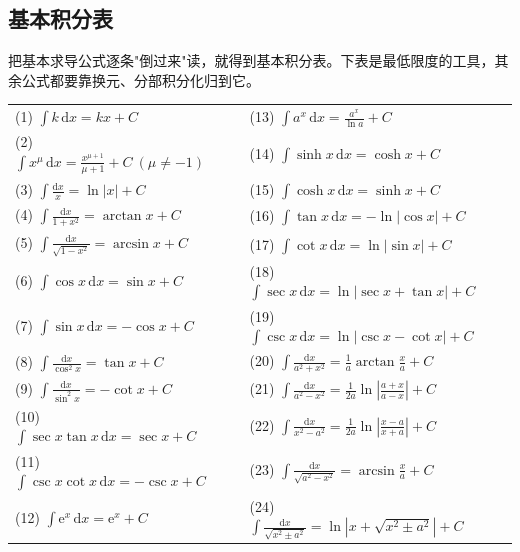 

\subsection{基本积分表}

把基本求导公式逐条"倒过来"读，就得到基本积分表。下表是最低限度的工具，其余公式都要靠换元、分部积分化归到它。

\begin{center}
\begin{tabular}{@{}ll@{\qquad}ll@{}}
\toprule
(1) $\displaystyle\int k\,\mathrm{d}x=kx+C$ & &
(13) $\displaystyle\int a^x\,\mathrm{d}x=\frac{a^x}{\ln a}+C$ & \\[6pt]
(2) $\displaystyle\int x^{\mu}\,\mathrm{d}x=\frac{x^{\mu+1}}{\mu+1}+C\ (\mu\neq-1)$ & &
(14) $\displaystyle\int \sinh x\,\mathrm{d}x=\cosh x+C$ & \\[6pt]
(3) $\displaystyle\int\frac{\mathrm{d}x}{x}=\ln|x|+C$ & &
(15) $\displaystyle\int \cosh x\,\mathrm{d}x=\sinh x+C$ & \\[6pt]
(4) $\displaystyle\int\frac{\mathrm{d}x}{1+x^2}=\arctan x+C$ & &
(16) $\displaystyle\int\tan x\,\mathrm{d}x=-\ln|\cos x|+C$ & \\[6pt]
(5) $\displaystyle\int\frac{\mathrm{d}x}{\sqrt{1-x^2}}=\arcsin x+C$ & &
(17) $\displaystyle\int\cot x\,\mathrm{d}x=\ln|\sin x|+C$ & \\[6pt]
(6) $\displaystyle\int\cos x\,\mathrm{d}x=\sin x+C$ & &
(18) $\displaystyle\int\sec x\,\mathrm{d}x=\ln|\sec x+\tan x|+C$ & \\[6pt]
(7) $\displaystyle\int\sin x\,\mathrm{d}x=-\cos x+C$ & &
(19) $\displaystyle\int\csc x\,\mathrm{d}x=\ln|\csc x-\cot x|+C$ & \\[6pt]
(8) $\displaystyle\int\frac{\mathrm{d}x}{\cos^2x}=\tan x+C$ & &
(20) $\displaystyle\int\frac{\mathrm{d}x}{a^2+x^2}=\frac{1}{a}\arctan\frac{x}{a}+C$ & \\[6pt]
(9) $\displaystyle\int\frac{\mathrm{d}x}{\sin^2x}=-\cot x+C$ & &
(21) $\displaystyle\int\frac{\mathrm{d}x}{a^2-x^2}=\frac{1}{2a}\ln\left|\frac{a+x}{a-x}\right|+C$ & \\[6pt]
(10) $\displaystyle\int\sec x\tan x\,\mathrm{d}x=\sec x+C$ & &
(22) $\displaystyle\int\frac{\mathrm{d}x}{x^2-a^2}=\frac{1}{2a}\ln\left|\frac{x-a}{x+a}\right|+C$ & \\[6pt]
(11) $\displaystyle\int\csc x\cot x\,\mathrm{d}x=-\csc x+C$ & &
(23) $\displaystyle\int\frac{\mathrm{d}x}{\sqrt{a^2-x^2}}=\arcsin\frac{x}{a}+C$ & \\[6pt]
(12) $\displaystyle\int \mathrm{e}^x\,\mathrm{d}x=\mathrm{e}^x+C$ & &
(24) $\displaystyle\int\frac{\mathrm{d}x}{\sqrt{x^2\pm a^2}}=\ln\left|x+\sqrt{x^2\pm a^2}\right|+C$ & \\
\bottomrule
\end{tabular}
\end{center}


